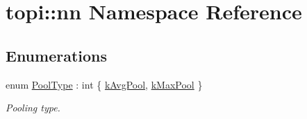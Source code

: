 \hypertarget{namespacetopi_1_1nn}{}\section{topi\+:\+:nn Namespace Reference}
\label{namespacetopi_1_1nn}
\subsection*{Enumerations}
\begin{DoxyCompactItemize}
\item 
enum \hyperlink{namespacetopi_1_1nn_ac531cfce9c3a031fa25cfb6ed1f9b95b}{Pool\+Type} \+: int \{ \hyperlink{namespacetopi_1_1nn_ac531cfce9c3a031fa25cfb6ed1f9b95babbfb6c4315c8b57e558600af1515d3d8}{k\+Avg\+Pool}, 
\hyperlink{namespacetopi_1_1nn_ac531cfce9c3a031fa25cfb6ed1f9b95ba3a406a1361a3c7ca311d3c514842c2f4}{k\+Max\+Pool}
 \}\begin{DoxyCompactList}\small\item\em Pooling type. \end{DoxyCompactList}
\end{DoxyCompactItemize}
